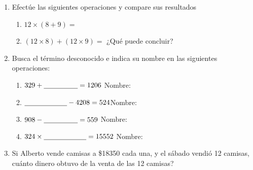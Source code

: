 \documentclass[fleqn]{article}
\begin{document}
\begin{enumerate}
  \item Efectúe las siguientes operaciones y compare sus resultados
  \begin{enumerate}
  \item $12\times (8+9)=$\noanswer
  \item $(12 \times 8)+(12\times 9)=$ \noanswer
  ¿Qué puede concluir?\noanswer
  \end{enumerate}
   \item Busca el término desconocido e indica su nombre en las siguientes operaciones:
   \begin{enumerate}
   \item $329+\underline{\hspace*{48pt}}=1206$ \qquad Nombre:\underline{\hspace*{96pt}}
   \item $\underline{\hspace*{60pt}}-4208=524$\qquad Nombre:\underline{\hspace*{96pt}}
   \item $908-\underline{\hspace*{48pt}}=559$ \qquad Nombre:\underline{\hspace*{96pt}}
   \item $324\times \underline{\hspace*{60pt}}=15552 $ \qquad Nombre:\underline{\hspace*{96pt}}
   \end{enumerate}
   \item Si Alberto vende camisas a \$18350 cada una, y el sábado vendió 12 camisas, cuánto dinero obtuvo de la venta de las 12 camisas?\noanswer
\end{enumerate}
\end{document}
